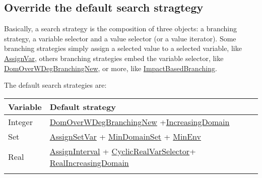 \subsection{Override the default search stragtegy}\label{solver:overridethedefaultsearchstrategy}\hypertarget{solver:overridethedefaultsearchstrategy}{}



Basically, a search strategy is the composition of three objects: a \gls{branching strategy}, a \gls{variable selector} and a \gls{value selector} (or a \gls{value iterator}). Some branching strategies simply assign a selected value to a selected variable, like \hyperlink{assignvar:assignvarbranchstrat}{AssignVar}, others branching strategies embed the variable selector, like \hyperlink{domoverwdeg:domoverwdegbranchstrat}{DomOverWDegBranchingNew}, or more, like  \hyperlink{impact:impactbranchstrat}{ImpactBasedBranching}.

The default search strategies are: 

\noindent\begin{tabular}{p{.4\linewidth}p{.6\linewidth}}
\hline
Variable &  Default strategy \\
\hline
Integer & \hyperlink{domoverwdeg:domoverwdegbranchstrat}{DomOverWDegBranchingNew} +\hyperlink{increasingdomain:increasingdomainvaliterator}{IncreasingDomain}\\
Set &   \hyperlink{assignsetvar:assignsetvarbranchstrat}{AssignSetVar} + \hyperlink{mindomset:mindomsetvarselector}{MinDomainSet} + \hyperlink{minenv:minenvvalselector}{MinEnv} \\
 Real &  \hyperlink{assigninterval:assignintervalbranchstrat}{AssignInterval} + \hyperlink{cyclicrealvarselector:cyclicrealvarselectorvarselector}{CyclicRealVarSelector}+ \hyperlink{realincreasingdomain:realincreasingdomainvaliterator}{RealIncreasingDomain} \\
\hline\\
\end{tabular}

